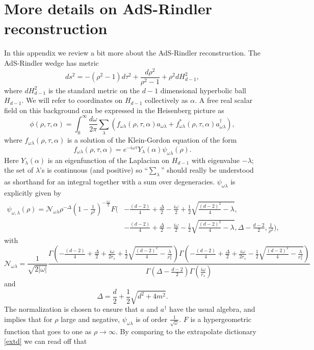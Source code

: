 \documentclass[12pt]{article}
\newcommand{\be}{\begin{equation}}
\newcommand{\ee}{\end{equation}}
\begin{document}
\appendix
\section{More details on AdS-Rindler reconstruction}\label{rindapp}
In this appendix we review a bit more about the AdS-Rindler reconstruction.  The AdS-Rindler wedge has metric
\be
ds^2=-(\rho^2-1)d\tau^2+\frac{d\rho^2}{\rho^2-1}+\rho^2 d H_{d-1}^2,
\ee 
where $d H_{d-1}^2$ is the standard metric on the $d-1$ dimensional hyperbolic ball $H_{d-1}$.  We will refer to coordinates on $H_{d-1}$ collectively as $\alpha$.  A free real scalar field on this background can be expressed in the Heisenberg picture as
\be\label{phieq}
\phi(\rho,\tau,\alpha)=\int_0^\infty\frac{d\omega}{2\pi}\sum_\lambda\left(f_{\omega \lambda}(\rho,\tau,\alpha) a_{\omega\lambda}+f_{\omega \lambda}^*(\rho,\tau,\alpha) a_{\omega\lambda}^\dagger\right),
\ee
where $f_{\omega \lambda}(\rho,\tau,\alpha)$ is a solution of the Klein-Gordon equation of the form
\be
f_{\omega \lambda}(\rho,\tau,\alpha)=e^{-i\omega \tau} Y_\lambda(\alpha) \psi_{\omega\lambda}(\rho).
\ee
Here $Y_\lambda(\alpha)$ is an eigenfunction of the Laplacian on $H_{d-1}$ with eigenvalue $-\lambda$; the set of $\lambda$'s is continuous (and positive) so ``$\sum_\lambda$'' should really be understood as shorthand for an integral together with a sum over degeneracies.  $\psi_{\omega \lambda}$ is explicitly given by
\begin{align}\nonumber
\psi_{\omega,\lambda}(\rho)=\mathcal{N}_{\omega\lambda}\rho^{-\Delta}\left(1-\frac{1}{\rho^2}\right)^{-\frac{i\omega}{2}}F\Bigg(&-\frac{(d-2)}{4}+\frac{\Delta}{2}-\frac{i\omega}{2}+\frac{1}{2}\sqrt{\frac{(d-2)^2}{4}-\lambda},\\
&-\frac{(d-2)}{4}+\frac{\Delta}{2}-\frac{i\omega}{2}-\frac{1}{2}\sqrt{\frac{(d-2)^2}{4}-\lambda},\Delta-\frac{d-2}{2},\frac{1}{\rho^2}\Bigg),
\end{align}
with 
\be
\mathcal{N}_{\omega \lambda}=\frac{1}{\sqrt{2|\omega|}}\frac{\Gamma\left(-\frac{(d-2)}{4}+\frac{\Delta}{2}+\frac{i\omega}{2r_s}+\frac{1}{2}\sqrt{\frac{(d-2)^2}{4}-\frac{\lambda}{r_s^2}}\right)\Gamma\left(-\frac{(d-2)}{4}+\frac{\Delta}{2}+\frac{i\omega}{2r_s}-\frac{1}{2}\sqrt{\frac{(d-2)^2}{4}-\frac{\lambda}{r_s^2}}\right)}{\Gamma\left(\Delta-\frac{d-2}{2}\right)\Gamma\left(\frac{i\omega}{r_s}\right)}
\ee
and
\be
\Delta=\frac{d}{2}+\frac{1}{2}\sqrt{d^2+4m^2}.
\ee
The normalization is chosen to ensure that $a$ and $a^\dagger$ have the usual algebra, and implies that for $\rho$ large and negative, $\psi_{\omega \lambda}$ is of order $\frac{1}{\sqrt{\omega}}$.  $F$ is a hypergeometric function that goes to one as $\rho \to \infty$.  By comparing to the extrapolate dictionary \eqref{extd} we can read off that 
\end{document}
